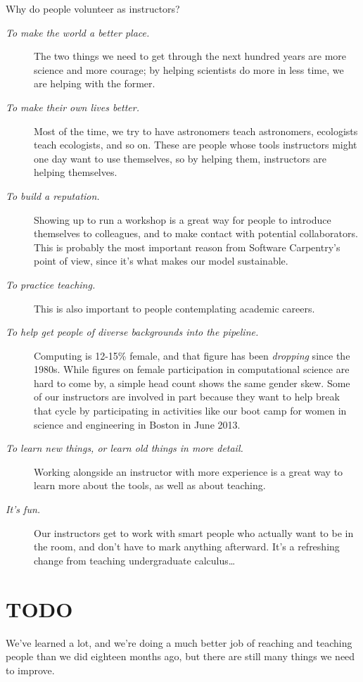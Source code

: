 \documentclass{article}
\begin{document}
Why do people volunteer as instructors?

\begin{description}
\item[\emph{To make the world a better place.}]
The two things we need to get through the next hundred years are more
science and more courage; by helping scientists do more in less time, we
are helping with the former.
\item[\emph{To make their own lives better.}]
Most of the time, we try to have astronomers teach astronomers,
ecologists teach ecologists, and so on. These are people whose tools
instructors might one day want to use themselves, so by helping them,
instructors are helping themselves.
\item[\emph{To build a reputation.}]
Showing up to run a workshop is a great way for people to introduce
themselves to colleagues, and to make contact with potential
collaborators. This is probably the most important reason from Software
Carpentry's point of view, since it's what makes our model sustainable.
\item[\emph{To practice teaching.}]
This is also important to people contemplating academic careers.
\item[\emph{To help get people of diverse backgrounds into the
pipeline.}]
Computing is 12-15\% female, and that figure has been \emph{dropping}
since the 1980s. While figures on female participation in computational
science are hard to come by, a simple head count shows the same gender
skew. Some of our instructors are involved in part because they want to
help break that cycle by participating in activities like our boot camp
for women in science and engineering in Boston in June 2013.
\item[\emph{To learn new things, or learn old things in more detail.}]
Working alongside an instructor with more experience is a great way to
learn more about the tools, as well as about teaching.
\item[\emph{It's fun.}]
Our instructors get to work with smart people who actually want to be in
the room, and don't have to mark anything afterward. It's a refreshing
change from teaching undergraduate calculus\ldots{}
\end{description}

\section{TODO}

We've learned a lot, and we're doing a much better job of reaching and
teaching people than we did eighteen months ago, but there are still
many things we need to improve.
\end{document}
